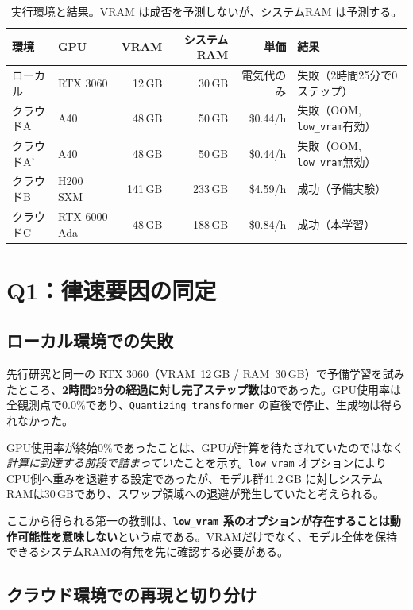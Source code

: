 \documentclass[10pt,twocolumn]{ltjsarticle}
\begin{document}
\begin{table}[t]
\centering\small
\caption{実行環境と結果。VRAM は成否を予測しないが、システムRAM は予測する。}
\label{tab:env}
\begin{tabular}{llrrrl}
\toprule
環境 & GPU & VRAM & システムRAM & 単価 & 結果 \\
\midrule
ローカル & RTX 3060 & 12\,GB & 30\,GB & 電気代のみ & 失敗（2時間25分で0ステップ） \\
クラウドA & A40 & 48\,GB & 50\,GB & \$0.44/h & 失敗（OOM, \texttt{low\_vram}有効） \\
クラウドA' & A40 & 48\,GB & 50\,GB & \$0.44/h & 失敗（OOM, \texttt{low\_vram}無効） \\
クラウドB & H200 SXM & 141\,GB & 233\,GB & \$4.59/h & 成功（予備実験） \\
クラウドC & RTX 6000 Ada & 48\,GB & 188\,GB & \$0.84/h & 成功（本学習） \\
\bottomrule
\end{tabular}
\end{table}

\section{Q1：律速要因の同定}

\subsection{ローカル環境での失敗}

先行研究と同一の RTX 3060（VRAM~12\,GB / RAM~30\,GB）で予備学習を試みたところ、\textbf{2時間25分の経過に対し完了ステップ数は0}であった。GPU使用率は全観測点で0.0\%であり、\texttt{Quantizing transformer} の直後で停止、生成物は得られなかった。

GPU使用率が終始0\%であったことは、GPUが計算を待たされていたのではなく\emph{計算に到達する前段で詰まっていた}ことを示す。\texttt{low\_vram} オプションによりCPU側へ重みを退避する設定であったが、モデル群41.2\,GB に対しシステムRAMは30\,GBであり、スワップ領域への退避が発生していたと考えられる。

ここから得られる第一の教訓は、\textbf{\texttt{low\_vram} 系のオプションが存在することは動作可能性を意味しない}という点である。VRAMだけでなく、モデル全体を保持できるシステムRAMの有無を先に確認する必要がある。

\subsection{クラウド環境での再現と切り分け}
\end{document}
